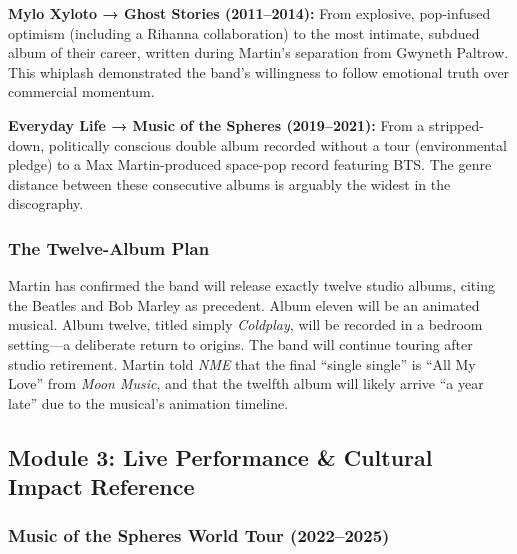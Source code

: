 \documentclass[11pt,letterpaper]{article}
\begin{document}
\textbf{Mylo Xyloto → Ghost Stories (2011--2014):} From explosive, pop-infused optimism (including a Rihanna collaboration) to the most intimate, subdued album of their career, written during Martin's separation from Gwyneth Paltrow. This whiplash demonstrated the band's willingness to follow emotional truth over commercial momentum.

\textbf{Everyday Life → Music of the Spheres (2019--2021):} From a stripped-down, politically conscious double album recorded without a tour (environmental pledge) to a Max Martin-produced space-pop record featuring BTS. The genre distance between these consecutive albums is arguably the widest in the discography.

\subsubsection{The Twelve-Album Plan}

Martin has confirmed the band will release exactly twelve studio albums, citing the Beatles and Bob Marley as precedent. Album eleven will be an animated musical. Album twelve, titled simply \textit{Coldplay}, will be recorded in a bedroom setting---a deliberate return to origins. The band will continue touring after studio retirement. Martin told \textit{NME} that the final ``single single'' is ``All My Love'' from \textit{Moon Music}, and that the twelfth album will likely arrive ``a year late'' due to the musical's animation timeline.

\subsection{Module 3: Live Performance \& Cultural Impact Reference}

\subsubsection{Music of the Spheres World Tour (2022--2025)}
\end{document}
